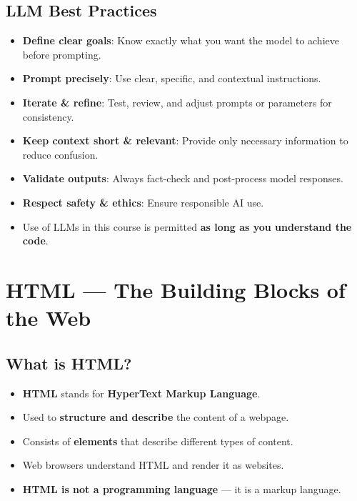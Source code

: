 \documentclass[hidelinks]{article}
\begin{document}
\subsection{LLM Best Practices}
\begin{itemize}
  \item \textbf{Define clear goals}: Know exactly what you want the model to achieve before prompting.
  \item \textbf{Prompt precisely}: Use clear, specific, and contextual instructions.
  \item \textbf{Iterate \& refine}: Test, review, and adjust prompts or parameters for consistency.
  \item \textbf{Keep context short \& relevant}: Provide only necessary information to reduce confusion.
  \item \textbf{Validate outputs}: Always fact-check and post-process model responses.
  \item \textbf{Respect safety \& ethics}: Ensure responsible AI use.
  \item Use of LLMs in this course is permitted \textbf{as long as you understand the code}.
\end{itemize}

\newpage
\section{HTML --- The Building Blocks of the Web}

\subsection{What is HTML?}
\begin{itemize}
  \item \textbf{HTML} stands for \textbf{HyperText Markup Language}.
  \item Used to \textbf{structure and describe} the content of a webpage.
  \item Consists of \textbf{elements} that describe different types of content.
  \item Web browsers understand HTML and render it as websites.
  \item \textbf{HTML is not a programming language} --- it is a markup language.
\end{itemize}
\end{document}

